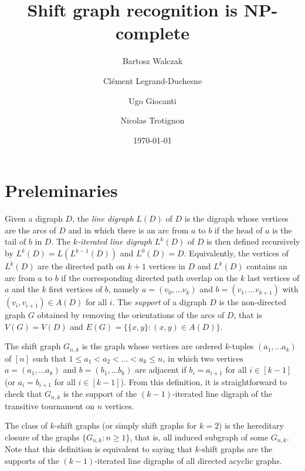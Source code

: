 \documentclass[11pt,a4aper]{article}
\title{Shift graph recognition is NP-complete}
\date{\today}
\author{
Bartosz Walczak\footnotemark[1] \and 
Cl\'ement Legrand-Duchesne\footnotemark[1]\and
Ugo Giocanti\footnotemark[1] \and
Nicolas Trotignon\footnotemark[4]
}
\theoremstyle{definition}
\renewcommand{\ge}{\geqslant}
\renewcommand{\le}{\leqslant}
\begin{document}
\maketitle

\renewcommand{\thefootnote}{\fnsymbol{footnote}} %

\footnotetext[2]{}

\renewcommand{\thefootnote}{\arabic{footnote}} %

\begin{abstract}
\end{abstract}


\section{Preleminaries}
Given a digraph $D$, the \emph{line digraph} $L(D)$ of $D$ is the digraph whose
vertices are the arcs of $D$ and in which there is an arc from $a$ to $b$ if the
head of $a$ is the tail of $b$ in $D$. The \emph{$k$-iterated line digraph} $L^k(D)$
of $D$ is then defined recursively by $L^k(D) = L(L^{k-1}(D))$ and $L^0(D) = D$.
Equivalently, the vertices of $L^k(D)$ are the directed path on $k+1$ vertices
in $D$ and $L^k(D)$ contains an arc from $a$ to $b$ if the corresponding
directed path overlap on the $k$ last vertices of $a$ and the $k$ first vertices
of $b$, namely $a = (v_0, \dots v_k)$ and $b=(v_1, \dots v_{k+1})$ with
$(v_i,v_{i+1}) \in A(D)$ for all $i$. The \emph{support} of a digraph $D$ is the
non-directed graph $G$ obtained by removing the orientations of the arcs of $D$,
that is $V(G) = V(D)$ and $E(G) = \{\{x,y\} \colon (x,y) \in A(D)\}$. 

The shift graph $G_{n,k}$ is the graph whose vertices are ordered $k$-tuples
$(a_1, \dots a_k)$ of $[n]$ such that $1 \le a_1 < a_2 < \dots < a_k \le n$, in
which two vertices $a = (a_1, \dots a_k)$ and $b = (b_1, \dots b_k)$ are
adjacent if $b_i = a_{i+1}$ for all $i \in [k-1]$ (or $a_i = b_{i+1}$ for all
$i \in [k-1]$). From this definition, it is straightforward to check that
$G_{n,k}$ is the support of the $(k-1)$-iterated line digraph of the transitive
tournament on $n$ vertices.

The class of $k$-shift graphs (or simply shift graphs for $k=2$) is the
hereditary closure of the graphs $\{G_{n,k} : n \ge 1\}$, that is, all induced
subgraph of some $G_{n,k}$. Note that this definition is equivalent to saying
that $k$-shift graphs are the supports of the $(k-1)$-iterated line digraphs of
all directed acyclic graphs.
\end{document}
